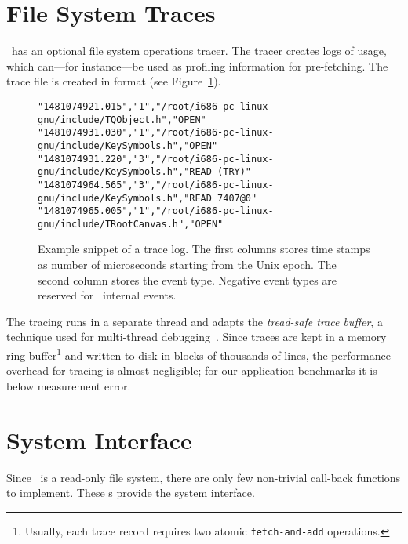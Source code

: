 \section{File System Traces}
\cvmfs\ has an optional file system operations tracer.
The tracer creates logs of usage, which can---for instance---be used as profiling information for pre-fetching.
The trace file is created in  format (see Figure~\ref{fig:traces}).
\begin{figure}
	\centering
	\begin{verbatim}
"1481074921.015","1","/root/i686-pc-linux-gnu/include/TQObject.h","OPEN"
"1481074931.030","1","/root/i686-pc-linux-gnu/include/KeySymbols.h","OPEN"
"1481074931.220","3","/root/i686-pc-linux-gnu/include/KeySymbols.h","READ (TRY)"
"1481074964.565","3","/root/i686-pc-linux-gnu/include/KeySymbols.h","READ 7407@0"
"1481074965.005","1","/root/i686-pc-linux-gnu/include/TRootCanvas.h","OPEN"
	\end{verbatim}
	\caption{Example snippet of a trace log. The first columns stores time stamps as number of microseconds starting from the Unix epoch. The second column stores the event type. Negative event types are reserved for \cvmfs\ internal events.}
	\label{fig:traces}
\end{figure}

The tracing runs in a separate thread and adapts the \emph{tread-safe trace buffer}, a technique used for multi-thread debugging~\cite[Chapter 8]{multicore06}.
Since traces are kept in a memory ring buffer\footnote{Usually, each trace record requires two atomic \texttt{fetch-and-add} operations.} and written to disk in blocks of thousands of lines, the performance overhead for tracing is almost negligible; for our application benchmarks it is below measurement error.


\section{System Interface}
\label{sct:interface}

Since \cvmfs\ is a read-only file system, there are only few non-trivial call-back functions to implement.
These s provide the system interface.

